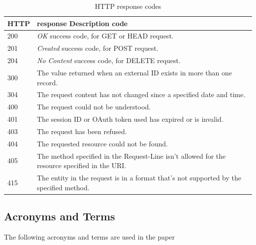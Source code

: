 \documentclass[10pt]{article}
\begin{document}
\begin{table}[!h]
\caption{HTTP response codes}
\begin{tabular}{p{1cm}p{15cm}}
HTTP & response Description code \\
\hline
200 & {\it OK} success code, for GET or HEAD request. \\
201 & {\it Created} success code, for POST request. \\
204 & {\it No Content} success code, for DELETE request. \\
300 & The value returned when an external ID exists in more than one
      record. \\
304 & The request content has not changed since a specified date and
      time. \\
400 & The request could not be understood. \\
401 & The session ID or OAuth token used has expired or is invalid. \\
403 & The request has been refused. \\
404 & The requested resource could not be found. \\
405 & The method specified in the Request-Line isn’t allowed for the
      resource specified in the URI. \\
415 & The entity in the request is in a format that’s not supported by
      the specified method. \\
\end{tabular}
\end{table}






\subsection{Acronyms and Terms}

The following acronyms and terms are used in the paper
\end{document}
